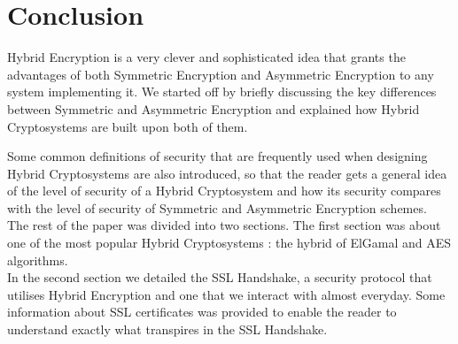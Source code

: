 \section{Conclusion}

\label{sec:conclusion}

Hybrid Encryption is a very clever and sophisticated idea that grants the advantages of both Symmetric Encryption and Asymmetric Encryption to any system implementing it. We started off by briefly discussing the key differences between Symmetric and Asymmetric Encryption and explained how Hybrid Cryptosystems are built upon both of them.

Some common definitions of security that are frequently used when designing Hybrid Cryptosystems are also introduced, so that the reader gets a general idea of the level of security of a Hybrid Cryptosystem and how its security compares with the level of security  of Symmetric and Asymmetric Encryption schemes.\\

The rest of the paper was divided into two sections. The first section was about one of the most popular Hybrid Cryptosystems : the hybrid of ElGamal and AES algorithms.\\

In the second section we detailed the SSL Handshake, a security protocol that utilises Hybrid Encryption and one that we interact with almost everyday. Some information about SSL certificates was provided to enable the reader to understand exactly what transpires in the SSL Handshake.
